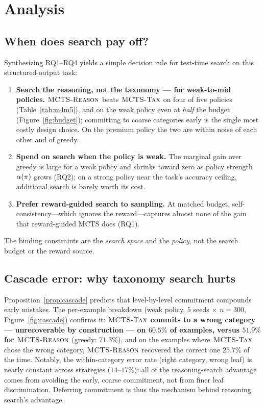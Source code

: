 \section{Analysis}
\label{sec:analysis}

\subsection{When does search pay off?}
Synthesizing RQ1--RQ4 yields a simple decision rule for test-time search on this
structured-output task:
\begin{enumerate}
\item \textbf{Search the reasoning, not the taxonomy --- for weak-to-mid
policies.} $\textsc{MCTS-Reason}$ beats $\textsc{MCTS-Tax}$ on four of five policies
(Table~\ref{tab:m4m5}), and on the weak policy even at \emph{half} the budget
(Figure~\ref{fig:budget}); committing to coarse categories early is the single
most costly design choice. On the premium policy the two are within noise of
each other and of greedy.
\item \textbf{Spend on search when the policy is weak.} The marginal gain over
greedy is large for a weak policy and shrinks toward zero as policy strength
$\alpha(\pi)$ grows (RQ2); on a strong policy near the task's accuracy ceiling,
additional search is barely worth its cost.
\item \textbf{Prefer reward-guided search to sampling.} At matched budget,
self-consistency---which ignores the reward---captures almost none of the gain that
reward-guided MCTS does (RQ1).
\end{enumerate}
The binding constraints are the \emph{search space} and the \emph{policy}, not the
search budget or the reward source.

\subsection{Cascade error: why taxonomy search hurts}
Proposition~\ref{prop:cascade} predicts that level-by-level commitment compounds
early mistakes. The per-example breakdown (weak policy, $5$ seeds $\times$
$n{=}300$, Figure~\ref{fig:cascade}) confirms it: \textbf{$\textsc{MCTS-Tax}$ commits to a
wrong category --- unrecoverable by construction --- on $60.5\%$ of examples,
versus $51.9\%$ for $\textsc{MCTS-Reason}$} (greedy: $71.3\%$), and on the examples where
$\textsc{MCTS-Tax}$ chose the wrong category, $\textsc{MCTS-Reason}$ recovered the correct one
$25.7\%$ of the time. Notably, the within-category error rate (right category,
wrong leaf) is nearly constant across strategies ($14$--$17\%$): all of the
reasoning-search advantage comes from avoiding the early, coarse commitment, not
from finer leaf discrimination. Deferring commitment is thus the mechanism behind
reasoning search's advantage.

